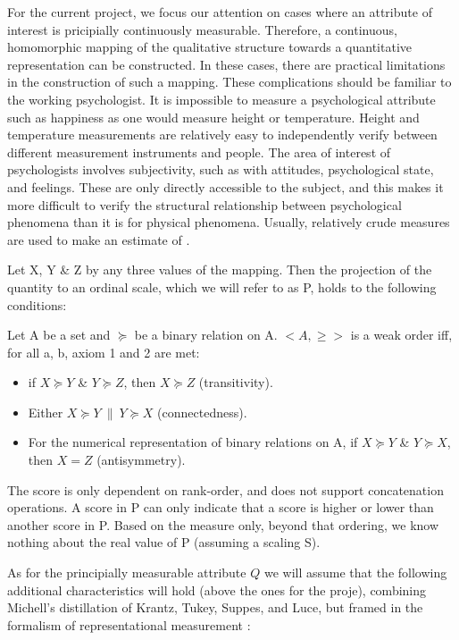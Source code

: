 \documentclass[utf8]{FrontiersinVancouver}
\begin{document}
For the current project, we focus our attention on cases where an attribute of interest is pricipially continuously measurable. Therefore, a continuous, homomorphic mapping of the qualitative structure towards a quantitative representation can be constructed. In these cases, there are practical limitations in the construction of such a mapping. These complications should be familiar to the working psychologist. It is impossible to measure a psychological attribute such as happiness as one would measure height or temperature. Height and temperature measurements are relatively easy to independently verify between different measurement instruments and people. The area of interest of psychologists involves subjectivity, such as with attitudes, psychological state, and feelings. These are only directly accessible to the subject, and this makes it more difficult to verify the structural relationship between psychological phenomena than it is for physical phenomena. Usually, relatively crude measures are used to make an estimate of . 

Let X, Y \& Z by any three values of the mapping. Then the projection of the quantity to an ordinal scale, which we will refer to as P, holds to the following conditions:

Let A be a set and $\succeq$ be a binary relation on A. $<A, \geq>$ is a weak order iff, for all a, b, axiom 1 and 2 are met:

\begin{itemize}
    \item if $X \succeq Y$ \& $Y \succeq Z$, then $X \succeq Z$ (transitivity).
    \item Either $X \succeq Y\ \|\ Y \succeq X$ (connectedness).
    \item For the numerical representation of binary relations on A, if $X \succeq Y$ \& $Y \succeq X$, then $X = Z$ (antisymmetry).
\end{itemize}

The score is only dependent on rank-order, and does not support concatenation operations. A score in P can only indicate that a score is higher or lower than another score in P. Based on the measure only, beyond that ordering, we know nothing about the real value of P (assuming a scaling S). 

As for the principially measurable attribute $Q$ we will assume that the following additional characteristics will hold (above the ones for the proje), combining Michell's distillation of Krantz, Tukey, Suppes, and Luce, but framed in the formalism of representational measurement \citep{krantzFoundationsMeasurement1971}:
\end{document}
